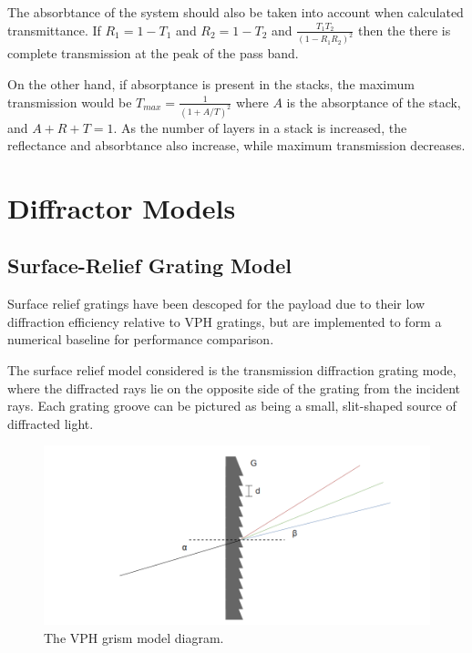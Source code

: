 The absorbtance of the system should also be taken into account when calculated transmittance. If $R_1 = 1 - T_1$ and $R_2 = 1 - T_2$ and $\frac{T_1T_2}{(1-R_1R_2)^2}$ then the there is complete transmission at the peak of the pass band.

On the other hand, if absorptance is present in the stacks, the maximum transmission would be $T_{max}=\frac{1}{(1+A/T)^2}$ where $A$ is the absorptance of the stack, and $A + R + T = 1$. As the number of layers in a stack is increased, the reflectance and absorbtance also increase, while maximum transmission decreases. 
\\


\section{Diffractor Models}

\subsection{Surface-Relief Grating Model} 
Surface relief gratings have been descoped for the payload due to their low diffraction efficiency relative to VPH gratings, but are implemented to form a numerical baseline for performance comparison.

The surface relief model considered is the transmission diffraction grating mode, where the diffracted rays lie on the opposite side of the grating from the incident rays. Each grating groove can be pictured as being a small, slit-shaped source of diffracted light.

\begin{figure}[H]
\centering
\includegraphics[width=\textwidth]{figures/surface-relief-grating-model.pdf}
\caption{The VPH grism model diagram.}
\label{fig:surface-relief-grating-model}
\end{figure}


